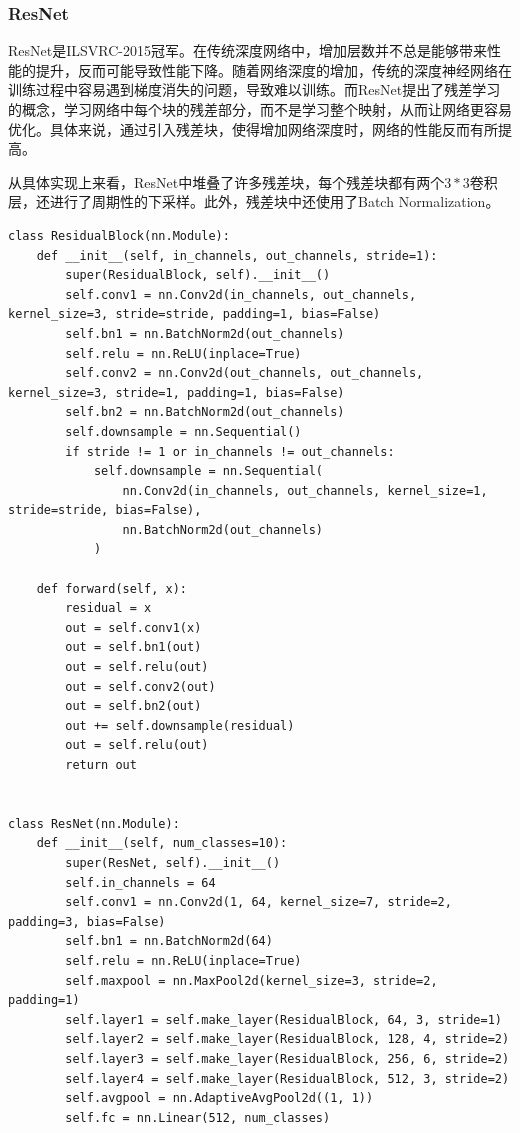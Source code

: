 \documentclass{article}
\begin{document}
\subsubsection{ResNet}
ResNet是ILSVRC-2015冠军。在传统深度网络中，增加层数并不总是能够带来性能的提升，反而可能导致性能下降。随着网络深度的增加，传统的深度神经网络在训练过程中容易遇到梯度消失的问题，导致难以训练。而ResNet提出了残差学习的概念，学习网络中每个块的残差部分，而不是学习整个映射，从而让网络更容易优化。具体来说，通过引入残差块，使得增加网络深度时，网络的性能反而有所提高。

从具体实现上来看，ResNet中堆叠了许多残差块，每个残差块都有两个$3*3$卷积层，还进行了周期性的下采样。此外，残差块中还使⽤了Batch Normalization。
\begin{lstlisting}
class ResidualBlock(nn.Module):
    def __init__(self, in_channels, out_channels, stride=1):
        super(ResidualBlock, self).__init__()
        self.conv1 = nn.Conv2d(in_channels, out_channels, kernel_size=3, stride=stride, padding=1, bias=False)
        self.bn1 = nn.BatchNorm2d(out_channels)
        self.relu = nn.ReLU(inplace=True)
        self.conv2 = nn.Conv2d(out_channels, out_channels, kernel_size=3, stride=1, padding=1, bias=False)
        self.bn2 = nn.BatchNorm2d(out_channels)
        self.downsample = nn.Sequential()
        if stride != 1 or in_channels != out_channels:
            self.downsample = nn.Sequential(
                nn.Conv2d(in_channels, out_channels, kernel_size=1, stride=stride, bias=False),
                nn.BatchNorm2d(out_channels)
            )

    def forward(self, x):
        residual = x
        out = self.conv1(x)
        out = self.bn1(out)
        out = self.relu(out)
        out = self.conv2(out)
        out = self.bn2(out)
        out += self.downsample(residual)
        out = self.relu(out)
        return out


class ResNet(nn.Module):
    def __init__(self, num_classes=10):
        super(ResNet, self).__init__()
        self.in_channels = 64
        self.conv1 = nn.Conv2d(1, 64, kernel_size=7, stride=2, padding=3, bias=False)
        self.bn1 = nn.BatchNorm2d(64)
        self.relu = nn.ReLU(inplace=True)
        self.maxpool = nn.MaxPool2d(kernel_size=3, stride=2, padding=1)
        self.layer1 = self.make_layer(ResidualBlock, 64, 3, stride=1)
        self.layer2 = self.make_layer(ResidualBlock, 128, 4, stride=2)
        self.layer3 = self.make_layer(ResidualBlock, 256, 6, stride=2)
        self.layer4 = self.make_layer(ResidualBlock, 512, 3, stride=2)
        self.avgpool = nn.AdaptiveAvgPool2d((1, 1))
        self.fc = nn.Linear(512, num_classes)


\end{lstlisting}
\end{document}
